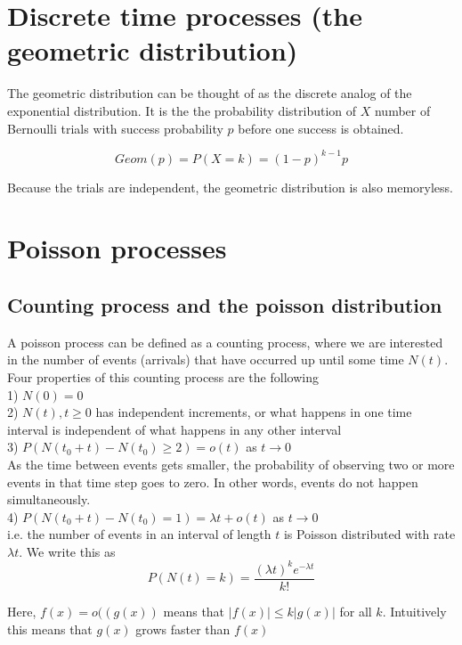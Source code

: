 \documentclass[12pt]{report}
\begin{document}
\section{Discrete time processes (the geometric distribution)}

The geometric distribution can be thought of as the discrete analog of the exponential distribution. It is the the probability distribution of $X$ number of Bernoulli trials with success probability $p$ before one success is obtained.

\begin{equation*}
Geom(p) = P(X= k) = (1-p)^{k-1}p
\end{equation*}

Because the trials are independent, the geometric distribution is also memoryless.


\section{Poisson processes}
\subsection{Counting process and the poisson distribution}
A poisson process can be defined as a counting process, where we are interested in the number of events (arrivals) that have occurred up until some time $N(t)$. Four properties of this counting process are the following\\
1) $N(0) = 0$\\
2) $N(t), t\ge0$ has independent increments, or what happens in one time interval is independent of what happens in any other interval\\
3) $P(N(t_0+t) - N(t_0) \ge2) = o(t) $ as $t\rightarrow0$\\
As the time between events gets smaller, the probability of observing two or more events in that time step goes to zero. In other words, events do not happen simultaneously.\\
4) $P(N(t_0+t) - N(t_0) =1 ) = \lambda t + o(t) $ as $t\rightarrow0$ \\
i.e. the number of events in an interval of length $t$ is Poisson distributed with rate $\lambda t$. We write this as
\begin{equation*}
P(N(t) = k) = \frac{(\lambda t)^k e^{-\lambda t} }{k!}
\end{equation*}

Here, $f(x) = o((g(x))$ means that $|f(x)| \le k|g(x)| $ for all $k$. Intuitively this means that $g(x)$ grows faster than $f(x)$
\end{document}
